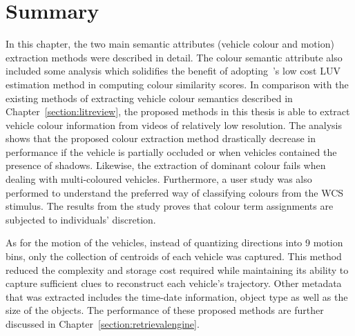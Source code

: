 
\section{Summary}
In this chapter, the two main semantic attributes (vehicle colour and motion) extraction methods were described in detail. The colour semantic attribute also included some analysis which solidifies the benefit of adopting~'s low cost LUV estimation method in computing colour similarity scores.
In comparison with the existing methods of extracting vehicle colour semantics described in Chapter~\ref{section:litreview}, the proposed methods in this thesis is able to extract vehicle colour information from videos of relatively low resolution.
The analysis shows that the proposed colour extraction method drastically decrease in performance if the vehicle is partially occluded or when vehicles contained the presence of shadows. Likewise, the extraction of dominant colour fails when dealing with multi-coloured vehicles.
Furthermore, a user study was also performed to understand the preferred way of classifying colours from the WCS stimulus. The results from the study proves that colour term assignments are subjected to individuals' discretion.

As for the motion of the vehicles, instead of quantizing directions into 9 motion bins, only the collection of centroids of each vehicle was captured. This method reduced the complexity and storage cost required while maintaining its ability to capture sufficient clues to reconstruct each vehicle's trajectory.
Other metadata that was extracted includes the time-date information, object type as well as the size of the objects.
The performance of these proposed methods are further discussed in Chapter~\ref{section:retrievalengine}.





